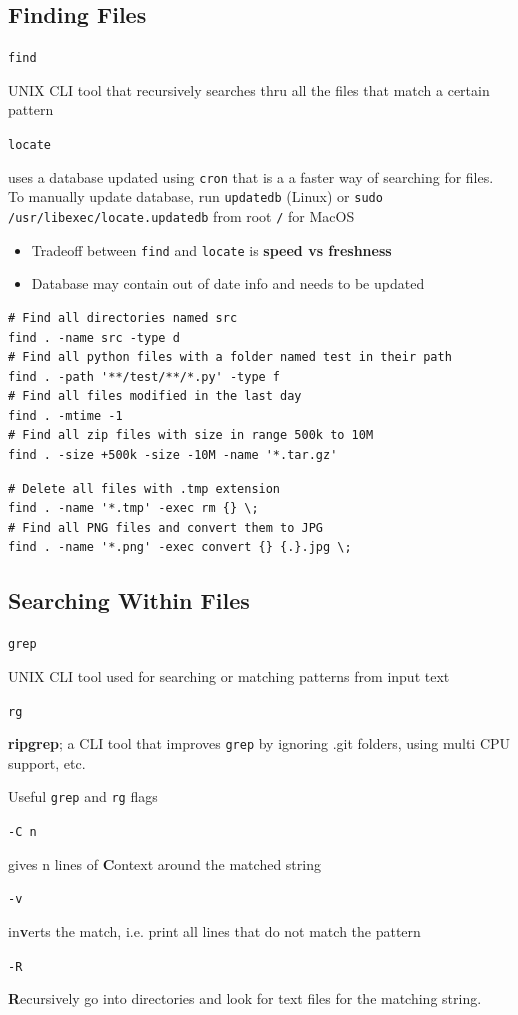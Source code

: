 \documentclass[letterpaper,12pt]{article}
\newcommand*{\lstitem}[1]{
  \setbox0\hbox{\lstinline{#1}}
  \item[\usebox0]
}
\begin{document}
\subsection{Finding Files}

\begin{description}
 \lstitem{find} UNIX CLI tool that recursively searches thru all the files that match a certain pattern
 \lstitem{locate} uses a database updated using \lstinline{cron} that is a a faster way of searching for files. To manually update database, run \lstinline{updatedb} (Linux) or \lstinline{sudo /usr/libexec/locate.updatedb} from root \lstinline{/} for MacOS
\end{description}

\begin{itemize}
 \item Tradeoff between \lstinline{find} and \lstinline{locate} is \textbf{speed vs freshness}
 \item Database may contain out of date info and needs to be updated
\end{itemize}

\begin{lstlisting}
# Find all directories named src
find . -name src -type d
# Find all python files with a folder named test in their path
find . -path '**/test/**/*.py' -type f
# Find all files modified in the last day
find . -mtime -1
# Find all zip files with size in range 500k to 10M
find . -size +500k -size -10M -name '*.tar.gz'
\end{lstlisting}

\begin{lstlisting}
# Delete all files with .tmp extension
find . -name '*.tmp' -exec rm {} \;
# Find all PNG files and convert them to JPG
find . -name '*.png' -exec convert {} {.}.jpg \;
\end{lstlisting}

\subsection{Searching Within Files}
\begin{description}
 \lstitem{grep} UNIX CLI tool used for searching or matching patterns from input text
 \lstitem{rg} \textbf{ripgrep}; a CLI tool that improves \lstinline{grep} by ignoring .git folders, using multi CPU support, etc.
\end{description}

Useful \lstinline{grep} and \lstinline{rg} flags
\begin{description}
 \lstitem{-C n} gives n lines of \textbf{C}ontext around the matched string
 \lstitem{-v} in\textbf{v}erts the match, i.e. print all lines that do not match the pattern
 \lstitem{-R} \textbf{R}ecursively go into directories and look for text files for the matching string.
\end{description}
\end{document}
